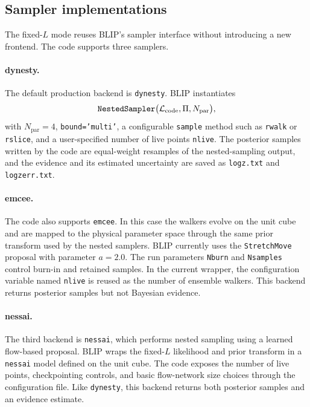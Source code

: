 \documentclass[11pt]{article}
\begin{document}
\subsection{Sampler implementations}

The fixed-$L$ mode reuses BLIP's sampler interface without introducing a new frontend. The code supports three samplers.

\paragraph{dynesty.}
The default production backend is \texttt{dynesty}. BLIP instantiates
\begin{equation}
  \text{\texttt{NestedSampler}}
  \big(
    \mathcal{L}_{\mathrm{code}},
    \Pi,
    N_{\mathrm{par}}
  \big),
\end{equation}
with $N_{\mathrm{par}}=4$, \texttt{bound='multi'}, a configurable \texttt{sample} method such as \texttt{rwalk} or \texttt{rslice}, and a user-specified number of live points \texttt{nlive}. The posterior samples written by the code are equal-weight resamples of the nested-sampling output, and the evidence and its estimated uncertainty are saved as \texttt{logz.txt} and \texttt{logzerr.txt}.

\paragraph{emcee.}
The code also supports \texttt{emcee}. In this case the walkers evolve on the unit cube and are mapped to the physical parameter space through the same prior transform used by the nested samplers. BLIP currently uses the \texttt{StretchMove} proposal with parameter $a=2.0$. The run parameters \texttt{Nburn} and \texttt{Nsamples} control burn-in and retained samples. In the current wrapper, the configuration variable named \texttt{nlive} is reused as the number of ensemble walkers. This backend returns posterior samples but not Bayesian evidence.

\paragraph{nessai.}
The third backend is \texttt{nessai}, which performs nested sampling using a learned flow-based proposal. BLIP wraps the fixed-$L$ likelihood and prior transform in a \texttt{nessai} model defined on the unit cube. The code exposes the number of live points, checkpointing controls, and basic flow-network size choices through the configuration file. Like \texttt{dynesty}, this backend returns both posterior samples and an evidence estimate.
\end{document}
